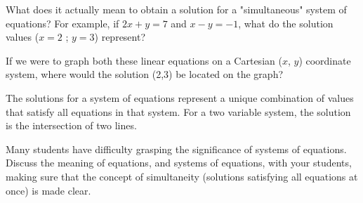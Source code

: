 

What does it actually mean to obtain a solution for a "simultaneous" system of equations?  For example, if $2x + y = 7$ and $x - y = -1$, what do the solution values ($x = 2$ ; $y = 3$) represent?

If we were to graph both these linear equations on a Cartesian ($x$, $y$) coordinate system, where would the solution (2,3) be located on the graph?







The solutions for a system of equations represent a unique combination of values that satisfy all equations in that system.  For a two variable system, the solution is the intersection of two lines.







Many students have difficulty grasping the significance of systems of equations.  Discuss the meaning of equations, and systems of equations, with your students, making sure that the concept of simultaneity (solutions satisfying all equations at once) is made clear.




